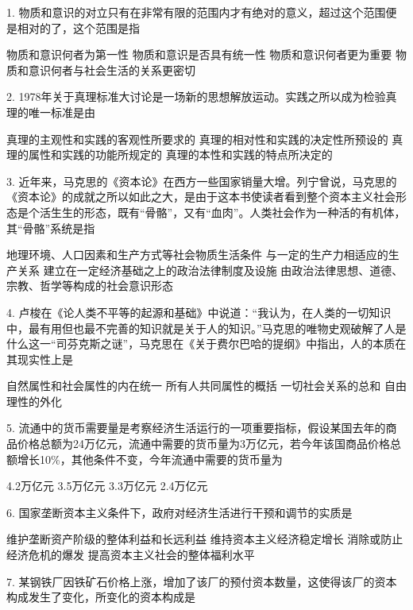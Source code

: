 1. 物质和意识的对立只有在非常有限的范围内才有绝对的意义，超过这个范围便是相对的了，这个范围是指
\begin{choices}
	 物质和意识何者为第一性
	 物质和意识是否具有统一性
	 物质和意识何者更为重要
	 物质和意识何者与社会生活的关系更密切
\end{choices}
2. 1978年关于真理标准大讨论是一场新的思想解放运动。实践之所以成为检验真理的唯一标准是由
\begin{choices}
	 真理的主观性和实践的客观性所要求的
	 真理的相对性和实践的决定性所预设的
	 真理的属性和实践的功能所规定的
	 真理的本性和实践的特点所决定的
\end{choices}

3. 近年来，马克思的《资本论》在西方一些国家销量大增。列宁曾说，马克思的《资本论》的成就之所以如此之大，是由于这本书使读者看到整个资本主义社会形态是个活生生的形态，既有“骨骼”，又有“血肉”。人类社会作为一种活的有机体，其“骨骼”系统是指
\begin{choices}
	 地理环境、人口因素和生产方式等社会物质生活条件
	 与一定的生产力相适应的生产关系
	 建立在一定经济基础之上的政治法律制度及设施
	 由政治法律思想、道德、宗教、哲学等构成的社会意识形态
\end{choices}
4. 卢梭在《论人类不平等的起源和基础》中说道：“我认为，在人类的一切知识中，最有用但也最不完善的知识就是关于人的知识。”马克思的唯物史观破解了人是什么这一“司芬克斯之谜”，马克思在《关于费尔巴哈的提纲》中指出，人的本质在其现实性上是
\begin{choices}
	 自然属性和社会属性的内在统一
	 所有人共同属性的概括
	 一切社会关系的总和
	 自由理性的外化
\end{choices}
5. 流通中的货币需要量是考察经济生活运行的一项重要指标，假设某国去年的商品价格总额为24万亿元，流通中需要的货币量为3万亿元，若今年该国商品价格总额增长10\%，其他条件不变，今年流通中需要的货币量为
\begin{choices}
	 4.2万亿元
	 3.5万亿元
	 3.3万亿元
	 2.4万亿元
\end{choices}
6. 国家垄断资本主义条件下，政府对经济生活进行干预和调节的实质是
\begin{choices}
	 维护垄断资产阶级的整体利益和长远利益
	 维持资本主义经济稳定增长
	 消除或防止经济危机的爆发
	 提高资本主义社会的整体福利水平
\end{choices}
7. 某钢铁厂因铁矿石价格上涨，增加了该厂的预付资本数量，这使得该厂的资本构成发生了变化，所变化的资本构成是
